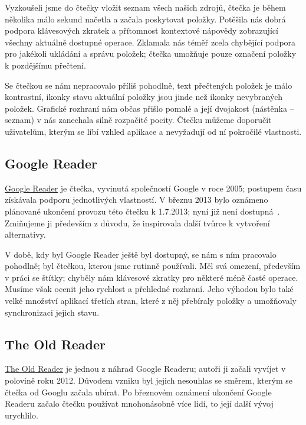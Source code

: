 Vyzkoušeli jsme do čtečky vložit seznam všech našich zdrojů, čtečka je během několika málo sekund načetla a začala poskytovat položky.
Potěšila nás dobrá podpora klávesových zkratek a přítomnost kontextové nápovědy zobrazující všechny aktuálně dostupné operace.
Zklamala nás téměř zcela chybějící podpora pro jakékoli ukládání a správu položek; čtečka umožňuje pouze označení položky k pozdějšímu přečtení.

Se čtečkou se nám nepracovalo příliš pohodlně, text přečtených položek je málo kontrastní, ikonky stavu aktuální položky jsou jinde než ikonky nevybraných položek.
Grafické rozhraní nám občas přišlo pomalé a její dvojakost (nástěnka -- seznam) v nás zanechala silně rozpačité pocity.
Čtečku můžeme doporučit uživatelům, kterým se líbí vzhled aplikace a nevyžadují od ní pokročilé vlastnosti.

\subsection{Google Reader}

\href{http://www.google.com/reader/about/}{Google Reader} je čtečka, vyvinutá společností Google v roce 2005; postupem času získávala podporu jednotlivých vlastností.
V březnu 2013 bylo oznámeno plánované ukončení provozu této čtečku k 1.7.2013; nyní již není dostupná~\cite{google-reader-down}.
Zmiňujeme ji především z důvodu, že inspirovala další tvůrce k vytvoření alternativy.

V době, kdy byl Google Reader ještě byl dostupný, se nám s ním pracovalo pohodlně; byl čtečkou, kterou jsme rutinně používali.
Měl svá omezení, především v práci se štítky; chyběly nám klávesové zkratky pro některé méně časté operace.
Musíme však ocenit jeho rychlost a přehledné rozhraní.
Jeho výhodou bylo také velké množství aplikací třetích stran, které z něj přebíraly položky a umožňovaly synchronizaci jejich stavu.

\subsection{The Old Reader}

\href{http://theoldreader.com/}{The Old Reader} je jednou z náhrad Google Readeru; autoři ji začali vyvíjet v polovině roku 2012.
Důvodem vzniku byl jejich nesouhlas se směrem, kterým se čtečka od Googlu začala ubírat.
Po březnovém oznámení ukončení Google Readeru začalo čtečku používat mnohonásobně více lidí, to její další vývoj urychlilo.

